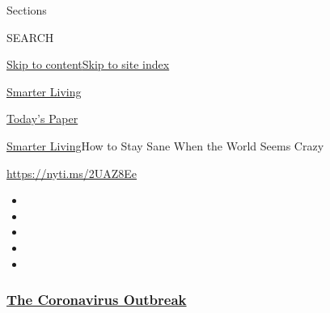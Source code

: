 Sections

SEARCH

\protect\hyperlink{site-content}{Skip to
content}\protect\hyperlink{site-index}{Skip to site index}

\href{https://www.nytimes3xbfgragh.onion/section/smarter-living}{Smarter
Living}

\href{https://myaccount.nytimes3xbfgragh.onion/auth/login?response_type=cookie\&client_id=vi}{}

\href{https://www.nytimes3xbfgragh.onion/section/todayspaper}{Today's
Paper}

\href{/section/smarter-living}{Smarter Living}\textbar{}How to Stay Sane
When the World Seems Crazy

\url{https://nyti.ms/2UAZ8Ee}

\begin{itemize}
\item
\item
\item
\item
\item
\end{itemize}

\hypertarget{the-coronavirus-outbreak}{%
\subsubsection{\texorpdfstring{\href{https://www.nytimes3xbfgragh.onion/news-event/coronavirus?name=styln-coronavirus-national\&region=TOP_BANNER\&block=storyline_menu_recirc\&action=click\&pgtype=Article\&impression_id=061d5590-efbb-11ea-b9a5-71e5d1ca15bb\&variant=undefined}{The
Coronavirus
Outbreak}}{The Coronavirus Outbreak}}\label{the-coronavirus-outbreak}}

